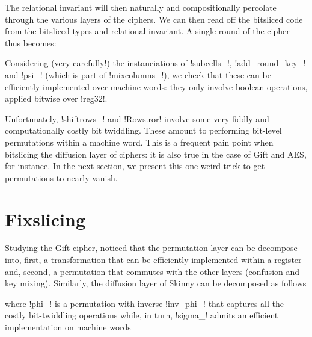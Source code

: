\documentclass[draft,english]{jflart}
\begin{document}
The relational invariant will then naturally and compositionally
percolate through the various layers of the ciphers. We can then read
off the bitsliced code from the bitsliced types and relational
invariant. A single round of the cipher thus becomes:
%


Considering (very carefully!) the instanciations of \coqe!subcells_!,
\coqe!add_round_key_! and \coqe!psi_! (which is part of
\coqe!mixcolumns_!), we check that these can be efficiently
implemented over machine words: they only involve boolean operations,
applied bitwise over \coqe!reg32!.

Unfortunately, \coqe!shiftrows_! and \coqe!Rows.ror! involve some very
fiddly and computationally costly bit twiddling. These amount to
performing bit-level permutations within a machine word. This is a
frequent pain point when bitslicing the diffusion layer of ciphers: it
is also true in the case of Gift and AES, for instance. In the next
section, we present this one weird trick to get permutations to nearly
vanish.

\section{Fixslicing}
\label{sec:fixslicing}




Studying the Gift cipher, \citet{adominicai} noticed that the
permutation layer can be decompose into, first, a transformation that
can be efficiently implemented within a register and, second, a
permutation that commutes with the other layers (confusion and key
mixing). Similarly, the diffusion layer of Skinny can be decomposed as
follows
%
\begin{prop}
\end{prop}
%
%
where \coqe!phi_! is a permutation with inverse \coqe!inv_phi_! that
captures all the costly bit-twiddling operations
%
%
%
while, in turn, \coqe!sigma_! admits an efficient implementation on
machine words
%
\end{document}
